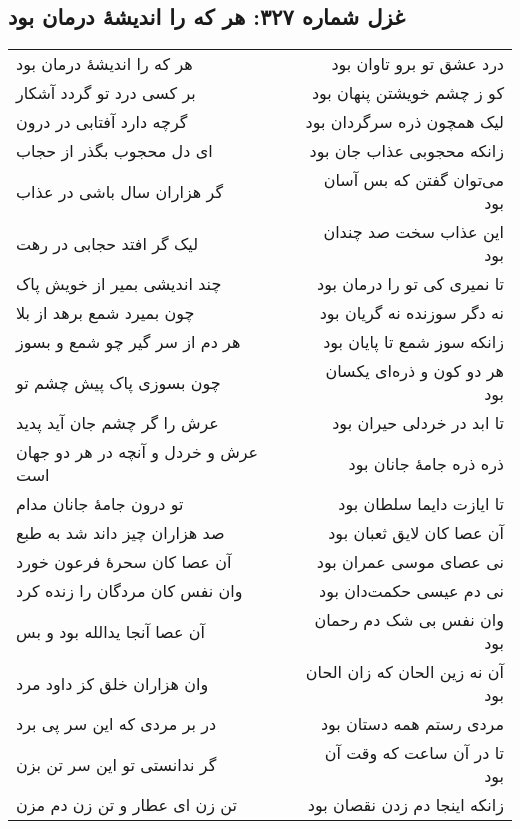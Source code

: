 \begin{center}
\section*{غزل شماره ۳۲۷: هر که را اندیشهٔ درمان بود}
\label{sec:327}
\begin{longtable}{l p{0.5cm} r}
هر که را اندیشهٔ درمان بود
&&
درد عشق تو برو تاوان بود
\\
بر کسی درد تو گردد آشکار
&&
کو ز چشم خویشتن پنهان بود
\\
گرچه دارد آفتابی در درون
&&
لیک همچون ذره سرگردان بود
\\
ای دل محجوب بگذر از حجاب
&&
زانکه محجوبی عذاب جان بود
\\
گر هزاران سال باشی در عذاب
&&
می‌توان گفتن که بس آسان بود
\\
لیک گر افتد حجابی در رهت
&&
این عذاب سخت صد چندان بود
\\
چند اندیشی بمیر از خویش پاک
&&
تا نمیری کی تو را درمان بود
\\
چون بمیرد شمع برهد از بلا
&&
نه دگر سوزنده نه گریان بود
\\
هر دم از سر گیر چو شمع و بسوز
&&
زانکه سوز شمع تا پایان بود
\\
چون بسوزی پاک پیش چشم تو
&&
هر دو کون و ذره‌ای یکسان بود
\\
عرش را گر چشم جان آید پدید
&&
تا ابد در خردلی حیران بود
\\
عرش و خردل و آنچه در هر دو جهان است
&&
ذره ذره جامهٔ جانان بود
\\
تو درون جامهٔ جانان مدام
&&
تا ایازت دایما سلطان بود
\\
صد هزاران چیز داند شد به طبع
&&
آن عصا کان لایق ثعبان بود
\\
آن عصا کان سحرهٔ فرعون خورد
&&
نی عصای موسی عمران بود
\\
وان نفس کان مردگان را زنده کرد
&&
نی دم عیسی حکمت‌دان بود
\\
آن عصا آنجا یدالله بود و بس
&&
وان نفس بی شک دم رحمان بود
\\
وان هزاران خلق کز داود مرد
&&
آن نه زین الحان که زان الحان بود
\\
در بر مردی که این سر پی برد
&&
مردی رستم همه دستان بود
\\
گر ندانستی تو این سر تن بزن
&&
تا در آن ساعت که وقت آن بود
\\
تن زن ای عطار و تن زن دم مزن
&&
زانکه اینجا دم زدن نقصان بود
\\
\end{longtable}
\end{center}
